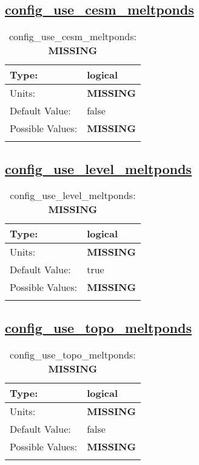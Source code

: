 \subsection[config\_use\_cesm\_meltponds]{\hyperref[sec:nm_tab_column_tracers]{config\_use\_cesm\_meltponds}}
\label{subsec:nm_sec_config_use_cesm_meltponds}
\begin{center}
\begin{longtable}{| p{2.0in} || p{4.0in} |}
    \hline
    Type: & logical \\
    \hline
    Units: & {\bf \color{red} MISSING} \\
    \hline
    Default Value: & false \\
    \hline
    Possible Values: & {\bf \color{red} MISSING} \\
    \hline
    \caption{config\_use\_cesm\_meltponds: {\bf \color{red} MISSING}}
\end{longtable}
\end{center}
\subsection[config\_use\_level\_meltponds]{\hyperref[sec:nm_tab_column_tracers]{config\_use\_level\_meltponds}}
\label{subsec:nm_sec_config_use_level_meltponds}
\begin{center}
\begin{longtable}{| p{2.0in} || p{4.0in} |}
    \hline
    Type: & logical \\
    \hline
    Units: & {\bf \color{red} MISSING} \\
    \hline
    Default Value: & true \\
    \hline
    Possible Values: & {\bf \color{red} MISSING} \\
    \hline
    \caption{config\_use\_level\_meltponds: {\bf \color{red} MISSING}}
\end{longtable}
\end{center}
\subsection[config\_use\_topo\_meltponds]{\hyperref[sec:nm_tab_column_tracers]{config\_use\_topo\_meltponds}}
\label{subsec:nm_sec_config_use_topo_meltponds}
\begin{center}
\begin{longtable}{| p{2.0in} || p{4.0in} |}
    \hline
    Type: & logical \\
    \hline
    Units: & {\bf \color{red} MISSING} \\
    \hline
    Default Value: & false \\
    \hline
    Possible Values: & {\bf \color{red} MISSING} \\
    \hline
    \caption{config\_use\_topo\_meltponds: {\bf \color{red} MISSING}}
\end{longtable}
\end{center}
